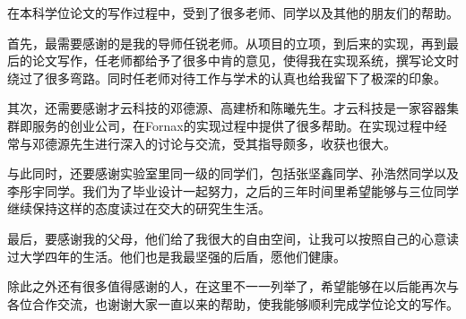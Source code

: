 \begin{thanks}

在本科学位论文的写作过程中，受到了很多老师、同学以及其他的朋友们的帮助。

首先，最需要感谢的是我的导师任锐老师。从项目的立项，到后来的实现，再到最后的论文写作，任老师都给予了很多中肯的意见，使得我在实现系统，撰写论文时绕过了很多弯路。同时任老师对待工作与学术的认真也给我留下了极深的印象。

其次，还需要感谢才云科技的邓德源、高建桥和陈曦先生。才云科技是一家容器集群即服务的创业公司，在Fornax的实现过程中提供了很多帮助。在实现过程中经常与邓德源先生进行深入的讨论与交流，受其指导颇多，收获也很大。

与此同时，还要感谢实验室里同一级的同学们，包括张坚鑫同学、孙浩然同学以及李彤宇同学。我们为了毕业设计一起努力，之后的三年时间里希望能够与三位同学继续保持这样的态度读过在交大的研究生生活。

最后，要感谢我的父母，他们给了我很大的自由空间，让我可以按照自己的心意读过大学四年的生活。他们也是我最坚强的后盾，愿他们健康。

除此之外还有很多值得感谢的人，在这里不一一列举了，希望能够在以后能再次与各位合作交流，也谢谢大家一直以来的帮助，使我能够顺利完成学位论文的写作。

\end{thanks}

